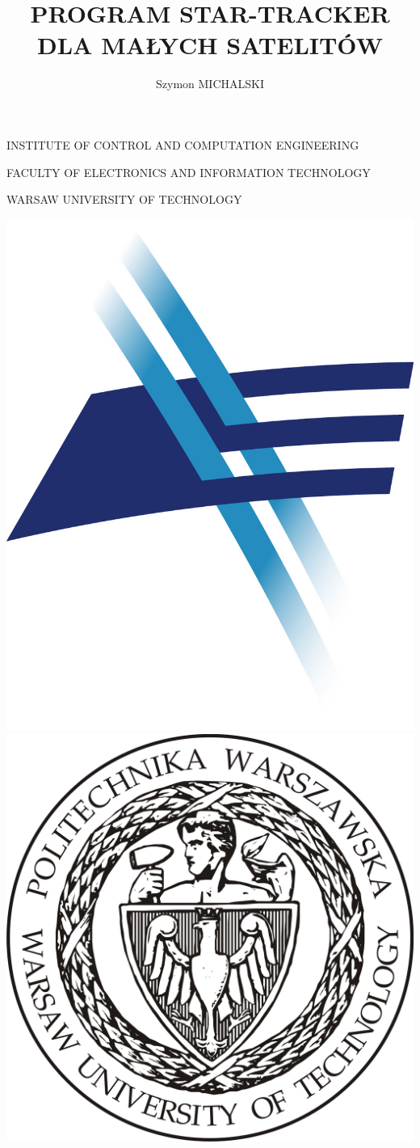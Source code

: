 \documentclass[12pt,a4paper,twoside]{article}
\author{Szymon MICHALSKI}
\title{PROGRAM STAR-TRACKER DLA MAŁYCH SATELITÓW}
\begin{document}

\begin{titlepage}
	\centering

	INSTITUTE OF CONTROL AND COMPUTATION ENGINEERING\par
	FACULTY OF ELECTRONICS AND INFORMATION TECHNOLOGY\par
	WARSAW UNIVERSITY OF TECHNOLOGY\par
	\vspace{0.5cm}
	\includegraphics[scale=0.3]{logo_WEiTI.jpg}
	\hspace{1cm}
	\includegraphics[scale=0.2]{Logo-PW-duze.jpg}

\end{titlepage}
\end{document}
